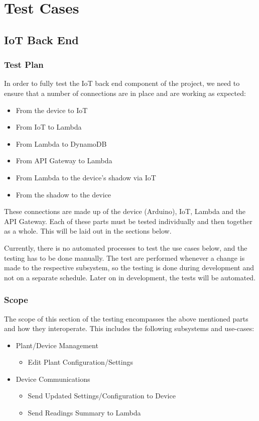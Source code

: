 \documentclass{article}
\begin{document}
\section{Test Cases}

	\subsection{IoT Back End}
		\subsubsection{Test Plan}
			In order to fully test the IoT back end component of the project, we need to ensure that a number of connections are in place and are working as expected:
			\begin{itemize}
				\item{From the device to IoT}
				\item{From IoT to Lambda}
				\item{From Lambda to DynamoDB}
				\\
				\item{From API Gateway to Lambda}
				\item{From Lambda to the device's shadow via IoT}
				\item{From the shadow to the device}
			\end{itemize}
			
			These connections are made up of the device (Arduino), IoT, Lambda and the API Gateway. Each of these parts must be tested individually and then together as a whole. This will be laid out in the sections below.
			
			Currently, there is no automated processes to test the use cases below, and the testing has to be done manually. The test are performed whenever a change is made to the respective subsystem, so the testing is done during development and not on a separate schedule. Later on in development, the tests will be automated.
		\subsubsection{Scope}
			 The scope of this section of the testing encompasses the above mentioned parts and how they interoperate. This includes the following subsystems and use-cases:
			 \begin{itemize}
			 	\item Plant/Device Management
					\begin{itemize}
						\item Edit Plant Configuration/Settings
					\end{itemize}
			 	\item Device Communications
				 	\begin{itemize}
				 		\item Send Updated Settings/Configuration to Device
				 		\item Send Readings Summary to Lambda
				 	\end{itemize}
			 \end{itemize}
			 
\end{document}

